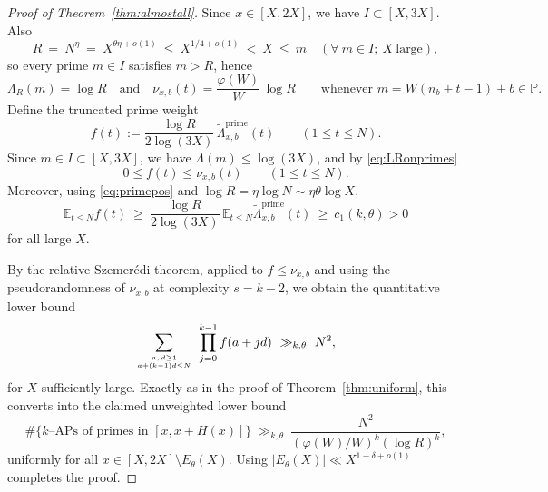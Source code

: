 \documentclass[11pt]{amsart}
\theoremstyle{definition}
\theoremstyle{remark}
\numberwithin{equation}{section}
\begin{document}
\begin{proof}[Proof of Theorem~\ref{thm:almostall}]
Since $x\in[X,2X]$, we have $I\subset[X,3X]$. Also
\[
R\ =\ N^{\eta}\ =\ X^{\theta\eta+o(1)}\ \le\ X^{1/4+o(1)}\ <\ X\ \le\ m\quad(\forall\ m\in I;\ X\ \text{large}),
\]
so every prime $m\in I$ satisfies $m>R$, hence
\begin{equation}\label{eq:LRonprimes}
\Lambda_R(m)=\log R\quad\text{and}\quad \nu_{x,b}(t)=\frac{\varphi(W)}{W}\,\log R\qquad\text{whenever }m=W(n_b+t-1)+b\in\mathbb P.
\end{equation}
Define the truncated prime weight
\[
 f(t):=\frac{\log R}{2\log(3X)}\,\tilde\Lambda^{\mathrm{prime}}_{x,b}(t)\qquad(1\le t\le N).
\]
Since $m\in I\subset[X,3X]$, we have $\Lambda(m)\le\log(3X)$, and by \eqref{eq:LRonprimes}
\[
0\le f(t)\le \nu_{x,b}(t)\qquad(1\le t\le N).
\]
Moreover, using \eqref{eq:primepos} and $\log R=\eta\log N\sim\eta\theta\log X$,
\[
\mathbb{E}_{t\le N} f(t)\ \ge\ \frac{\log R}{2\log(3X)}\,\mathbb{E}_{t\le N}\tilde\Lambda^{\mathrm{prime}}_{x,b}(t)
\ \ge\ c_1(k,\theta)>0
\]
for all large $X$.

By the relative Szemerédi theorem, applied to $f\le \nu_{x,b}$ and using the pseudorandomness of $\nu_{x,b}$ at complexity $s=k-2$, we obtain the quantitative lower bound
\begin{equation}\label{eq:relSZ-almost}
\sum_{a,\,d\ge1\atop a+(k-1)d\le N}\ \prod_{j=0}^{k-1} f(a+jd)\ \gg_{k,\theta}\ N^2,
\end{equation}
for $X$ sufficiently large. Exactly as in the proof of Theorem~\ref{thm:uniform}, this converts into the claimed unweighted lower bound
\[
\#\{\text{$k$--APs of primes in }[x,x+H(x)]\}\ \gg_{k,\theta}\ \frac{N^{2}}{(\varphi(W)/W)^{k}(\log R)^{k}},
\]
uniformly for all $x\in[X,2X]\setminus E_\theta(X)$. Using $|E_\theta(X)|\ll X^{1-\delta+o(1)}$ completes the proof.
\end{proof}
\end{document}
